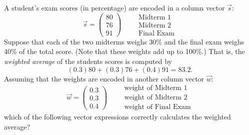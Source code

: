 \documentclass{ximera}
\author{Tae Eun Kim}
\begin{document}
\begin{exercise}
  A student's exam scores (in percentage) are encoded in a column vector $\vec{s}$:
  \[
    \vec{s} =
    \begin{pmatrix}
      80\\ 76\\ 91
    \end{pmatrix}
    \qquad
    \begin{array}{l}
      \text{Midterm 1}\\
      \text{Midterm 2}\\
      \text{Final Exam}
    \end{array}
  \]
  Suppose that each of the two midterms weighs 30\% and the final exam
  weighs 40\% of the total score. (Note that these weights add up to
  100\%.) That is, the \textit{weighted average} of the students
  scores is computed by
  \[
    (0.3) 80 + (0.3) 76 + (0.4) 91 = 83.2.
  \]
  Assuming that the weights are encoded in another column vector $\vec{w}$:
  \[
    \vec{w} =
    \begin{pmatrix}
      0.3\\ 0.3\\ 0.4
    \end{pmatrix}
    \qquad
    \begin{array}{l}
      \text{weight of Midterm 1}\\
      \text{weight of Midterm 2}\\
      \text{weight of Final Exam}
    \end{array}
  \]
  which of the following vector expressions correctly calculates the
  weighted average?
  \begin{selectAll}
    \pdfOnly{\end{multicols}}
  \end{selectAll}
\end{exercise}
\end{document}
